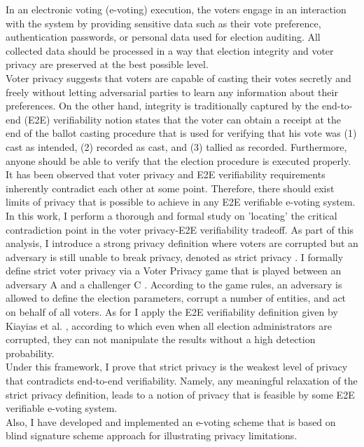 % 
% 
%
In an electronic voting (e-voting) execution, the voters engage in an interaction with the system by providing sensitive data such as their vote preference, authentication passwords, or personal data used for election auditing. All collected data should be processed in a way that election integrity and voter privacy are preserved at the best possible level. \\
Voter privacy suggests that voters are capable of casting their votes secretly and freely without letting adversarial parties to learn any information about their preferences. On the other hand, integrity is traditionally captured by  the end-to-end (E2E) verifiability notion states that the voter can obtain a receipt at the end of the ballot casting procedure that is used for verifying that his vote was (1) cast as intended, (2) recorded as cast, and (3) tallied as recorded. Furthermore, anyone should be able to verify that the election procedure is executed properly. It has been observed that voter privacy and E2E verifiability requirements inherently contradict each other at some point. Therefore, there should exist limits of privacy that is possible to achieve in any E2E verifiable e-voting system.\\
In this work, I perform a thorough and formal study on 'locating' the critical contradiction point in the voter privacy-E2E verifiability tradeoff. As part of this analysis, I introduce a strong privacy definition where voters are corrupted but an adversary is still unable to break privacy, denoted as  strict privacy . I formally define strict voter privacy via a Voter Privacy game that is played between an adversary  A and a challenger  C . According to the game rules, an adversary is allowed to define the election parameters, corrupt a number of entities, and act on behalf of all voters. As for I apply the E2E verifiability definition given by Kiayias et al. \cite{Kiayias2015}, according to which even when all election administrators are corrupted, they can not manipulate the results without a high detection probability.\\
Under this framework, I prove that strict privacy is the weakest level of privacy that contradicts end-to-end verifiability. Namely, any meaningful relaxation of the strict privacy definition, leads to a notion of privacy that is feasible by some E2E verifiable e-voting system.\\
Also, I have developed and implemented an e-voting scheme that is based on blind signature scheme approach for illustrating privacy limitations.

